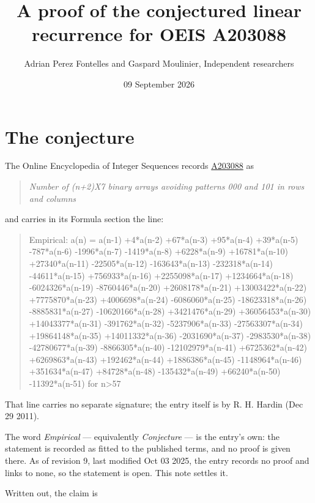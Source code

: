 \documentclass[11pt]{article}
\title{A proof of the conjectured linear recurrence for OEIS A203088}
\author{Adrian Perez Fontelles and Gaspard Moulinier, Independent researchers}
\date{09 September 2026}
\theoremstyle{definition}
\begin{document}
\maketitle
\section{The conjecture}

The Online Encyclopedia of Integer Sequences records \href{https://oeis.org/A203088}{A203088} as

\begin{quote}\itshape Number of (n+2)X7 binary arrays avoiding patterns 000 and 101 in rows and columns\end{quote}

and carries in its Formula section the line:

\begin{quote}\ttfamily Empirical: a(n) = a(n-1) +4*a(n-2) +67*a(n-3) +95*a(n-4) +39*a(n-5) -787*a(n-6) -1996*a(n-7) -1419*a(n-8) +6228*a(n-9) +16781*a(n-10) +27340*a(n-11) -22505*a(n-12) -163643*a(n-13) -232318*a(n-14) -44611*a(n-15) +756933*a(n-16) +2255098*a(n-17) +1234664*a(n-18) -6024326*a(n-19) -8760446*a(n-20) +2608178*a(n-21) +13003422*a(n-22) +7775870*a(n-23) +4006698*a(n-24) -6086060*a(n-25) -18623318*a(n-26) -8885831*a(n-27) -10620166*a(n-28) +3421476*a(n-29) +36056453*a(n-30) +14043377*a(n-31) -391762*a(n-32) -5237906*a(n-33) -27563307*a(n-34) +19864148*a(n-35) +14011332*a(n-36) -2031690*a(n-37) -2983530*a(n-38) -42780677*a(n-39) -8866305*a(n-40) -12102979*a(n-41) +6725362*a(n-42) +6269863*a(n-43) +192462*a(n-44) +1886386*a(n-45) -1148964*a(n-46) +351634*a(n-47) +84728*a(n-48) -135432*a(n-49) +66240*a(n-50) -11392*a(n-51) for n>57\end{quote}

That line carries no separate signature; the entry itself is by R. H. Hardin (Dec 29 2011).

The word {\itshape Empirical} --- equivalently {\itshape Conjecture} --- is the entry's own: the statement is recorded as fitted to the published terms, and no proof is given there. As of revision 9, last modified Oct 03 2025, the entry records no proof and links to none, so the statement is open. This note settles it.

Written out, the claim is
\end{document}
